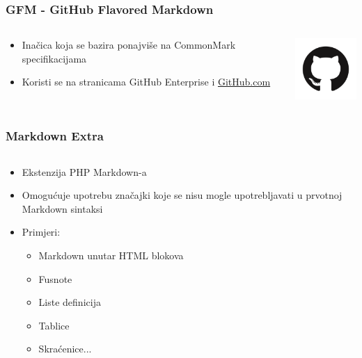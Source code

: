 \documentclass{beamer}
\begin{document}
\begin{frame}
	\frametitle{GFM - GitHub Flavored Markdown}

 	\begin{minipage}[0.2\textheight]{\textwidth}
 	\begin{columns}[T]
 	\begin{column}{0.8\textwidth}
 	\begin{itemize}
		\item{Inačica koja se bazira ponajviše na CommonMark specifikacijama}
		\item{Koristi se na stranicama GitHub Enterprise i \href{https://github.com/}{GitHub.com}}
	\end{itemize}
	\end{column}
	\begin{column}{0.2\textwidth}
	\includegraphics[width=2.5cm]{Slike/githublogo.png}
	\end{column}
	\end{columns}
	\end{minipage}

\end{frame}





\begin{frame}
	\frametitle{Markdown Extra}

 	\begin{minipage}[0.2\textheight]{\textwidth}
 	\begin{columns}[T]
 	\begin{column}{0.8\textwidth}
 	\begin{itemize}
 		\item{Ekstenzija PHP Markdown-a}
		\item{Omogućuje upotrebu značajki koje se nisu mogle upotrebljavati u prvotnoj Markdown sintaksi}
		\item{Primjeri: 
		\begin{itemize}
			\item{Markdown unutar HTML blokova}
			\item{Fusnote}
			\item{Liste definicija}
			\item{Tablice}
			\item{Skraćenice}...
		\end{itemize}}
	\end{itemize}
	\end{column}
	\end{columns}
	\end{minipage}

\end{frame}
\end{document}
